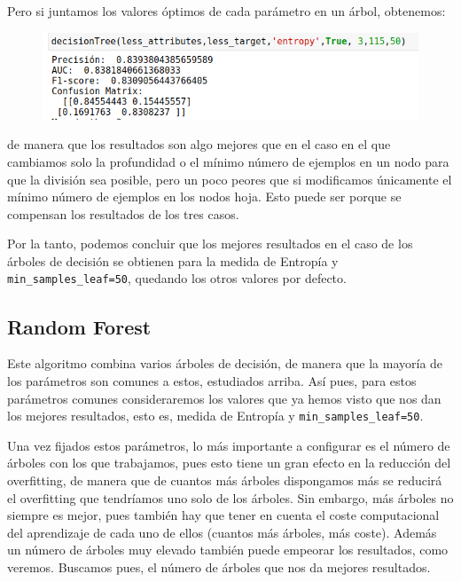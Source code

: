 \documentclass[a4paper,11pt]{article}
\begin{document}
Pero si juntamos los valores óptimos de cada parámetro en un árbol, obtenemos:
\begin{figure}[H]
	\centering
	\includegraphics[width=1\linewidth]{img/image6}
	\caption{}
	\label{fig:image6}
\end{figure}

de manera que los resultados son algo mejores que en el caso en el que cambiamos solo la profundidad o el mínimo número de ejemplos en un nodo para que la división sea posible, pero un poco peores que si modificamos únicamente el mínimo número de ejemplos en los nodos hoja. Esto puede ser porque se compensan los resultados de los tres casos. 

Por la tanto, podemos concluir que los mejores resultados en el caso de los árboles de decisión se obtienen para la medida de Entropía y \texttt{min_samples_leaf=50}, quedando los otros valores por defecto. 

\subsection{Random Forest}

Este algoritmo combina varios árboles de decisión, de manera que la mayoría de los parámetros son comunes a estos, estudiados arriba. Así pues, para estos parámetros comunes consideraremos los valores que ya hemos visto que nos dan los mejores resultados, esto es, medida de Entropía y \texttt{min_samples_leaf=50}. 

Una vez fijados estos parámetros, lo más importante a configurar es el número de árboles con los que trabajamos, pues esto tiene un gran efecto en la reducción del overfitting, de manera que de cuantos más árboles dispongamos más se reducirá el overfitting que tendríamos uno solo de los árboles. Sin embargo, más árboles no siempre es mejor, pues también hay que tener en cuenta el coste computacional del aprendizaje de cada uno de ellos (cuantos más árboles, más coste). Además un número de árboles muy elevado también puede empeorar los resultados, como veremos. Buscamos pues, el número de árboles que nos da mejores resultados. 
\end{document}

